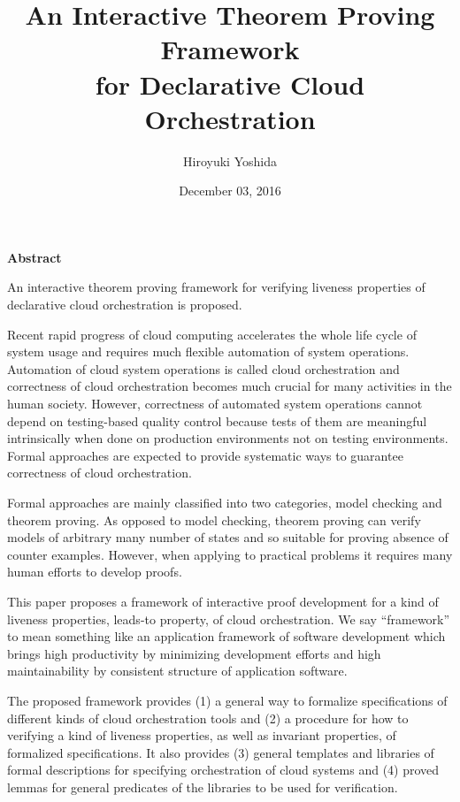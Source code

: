 \documentclass[12pt]{report}
\title{An Interactive Theorem Proving Framework\\for Declarative Cloud Orchestration}
\author{Hiroyuki Yoshida}
\date{December 03, 2016}
\begin{document}
\maketitle
{}  %
\setcounter{page}{1}
\strut
\vspace{20pt}
\begin{center}
{\LARGE\bf Abstract}
\end{center}
\vspace{20pt}
An interactive theorem proving framework for verifying liveness
properties of declarative cloud orchestration is proposed.

Recent rapid progress of cloud computing accelerates the whole life
cycle of system usage and requires much flexible automation of system
operations. Automation of cloud system operations is called cloud
orchestration and correctness of cloud orchestration becomes much
crucial for many activities in the human society.  However,
correctness of automated system operations cannot depend on testing-based
quality control because tests of them are meaningful intrinsically
when done on production environments not on testing environments.
Formal approaches are expected to provide systematic ways to guarantee
correctness of cloud orchestration.

Formal approaches are mainly classified into two categories, model
checking and theorem proving. As opposed to model checking, theorem
proving can verify models of arbitrary many number of states and so
suitable for proving absence of counter examples. However, when
applying to practical problems it requires many human efforts to
develop proofs.

This paper proposes a framework of interactive proof development for a
kind of liveness properties, leads-to property, of cloud
orchestration. We say ``framework'' to mean something like an
application framework of software development which brings high
productivity by minimizing development efforts and high
maintainability by consistent structure of application software.

The proposed framework provides (1) a general way to formalize
specifications of different kinds of cloud orchestration tools and (2)
a procedure for how to verifying a kind of liveness properties, as
well as invariant properties, of formalized specifications.  It also
provides (3) general templates and libraries of formal descriptions
for specifying orchestration of cloud systems and (4) proved lemmas
for general predicates of the libraries to be used for verification.
\end{document}
